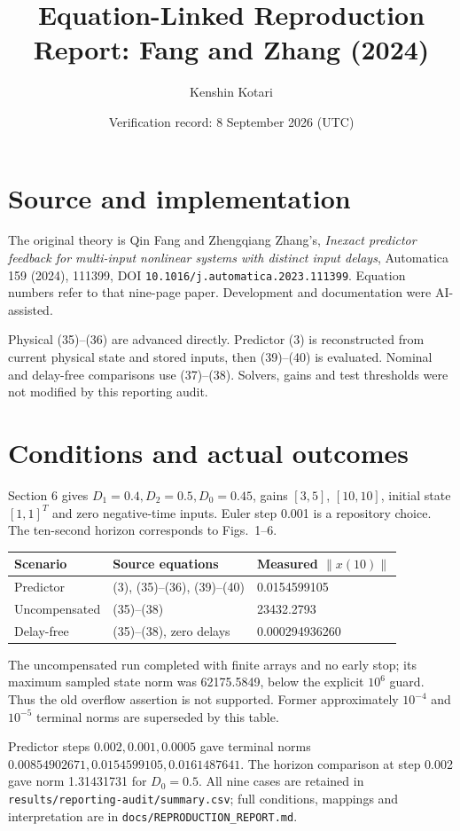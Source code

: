 \documentclass[11pt]{article}
\title{Equation-Linked Reproduction Report: Fang and Zhang (2024)}
\author{Kenshin Kotari}
\date{Verification record: 8 September 2026 (UTC)}
\begin{document}
\maketitle
\section{Source and implementation}
The original theory is Qin Fang and Zhengqiang Zhang's, \emph{Inexact predictor feedback for multi-input nonlinear systems with distinct input delays}, Automatica 159 (2024), 111399, DOI \texttt{10.1016/j.automatica.2023.111399}. Equation numbers refer to that nine-page paper. Development and documentation were AI-assisted.

Physical (35)--(36) are advanced directly. Predictor (3) is reconstructed from current physical state and stored inputs, then (39)--(40) is evaluated. Nominal and delay-free comparisons use (37)--(38). Solvers, gains and test thresholds were not modified by this reporting audit.
\section{Conditions and actual outcomes}
Section 6 gives $D_1=0.4,D_2=0.5,D_0=0.45$, gains $[3,5]$, $[10,10]$, initial state $[1,1]^T$ and zero negative-time inputs. Euler step 0.001 is a repository choice. The ten-second horizon corresponds to Figs.~1--6.
\begin{center}
\begin{tabular}{lll}
\toprule
Scenario & Source equations & Measured $\|x(10)\|$\\
\midrule
Predictor & (3), (35)--(36), (39)--(40) & 0.0154599105\\
Uncompensated & (35)--(38) & 23432.2793\\
Delay-free & (35)--(38), zero delays & 0.000294936260\\
\bottomrule
\end{tabular}
\end{center}
The uncompensated run completed with finite arrays and no early stop; its maximum sampled state norm was 62175.5849, below the explicit $10^6$ guard. Thus the old overflow assertion is not supported. Former approximately $10^{-4}$ and $10^{-5}$ terminal norms are superseded by this table.

Predictor steps $0.002,0.001,0.0005$ gave terminal norms $0.00854902671,0.0154599105,0.0161487641$. The horizon comparison at step 0.002 gave norm 1.31431731 for $D_0=0.5$. All nine cases are retained in \texttt{results/reporting-audit/summary.csv}; full conditions, mappings and interpretation are in \texttt{docs/REPRODUCTION\_REPORT.md}.
\end{document}
